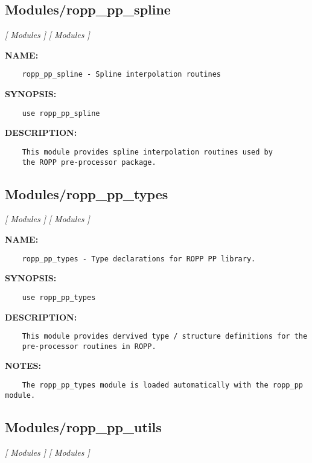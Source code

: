 \subsection{Modules/ropp\_pp\_spline}
\textsl{[ Modules ]}
\textsl{[ Modules ]}

\label{ch:robo47}
\label{ch:Modules_ropp_pp_spline}
\textbf{NAME:}\hspace{0.08in}\begin{Verbatim}
    ropp_pp_spline - Spline interpolation routines
\end{Verbatim}
\textbf{SYNOPSIS:}\hspace{0.08in}\begin{Verbatim}
    use ropp_pp_spline
\end{Verbatim}
\textbf{DESCRIPTION:}\hspace{0.08in}\begin{Verbatim}
    This module provides spline interpolation routines used by
    the ROPP pre-processor package.
\end{Verbatim}
\subsection{Modules/ropp\_pp\_types}
\textsl{[ Modules ]}
\textsl{[ Modules ]}

\label{ch:robo48}
\label{ch:Modules_ropp_pp_types}
\textbf{NAME:}\hspace{0.08in}\begin{Verbatim}
    ropp_pp_types - Type declarations for ROPP PP library.
\end{Verbatim}
\textbf{SYNOPSIS:}\hspace{0.08in}\begin{Verbatim}
    use ropp_pp_types
\end{Verbatim}
\textbf{DESCRIPTION:}\hspace{0.08in}\begin{Verbatim}
    This module provides dervived type / structure definitions for the
    pre-processor routines in ROPP.
\end{Verbatim}
\textbf{NOTES:}\hspace{0.08in}\begin{Verbatim}
    The ropp_pp_types module is loaded automatically with the ropp_pp module.
\end{Verbatim}
\subsection{Modules/ropp\_pp\_utils}
\textsl{[ Modules ]}
\textsl{[ Modules ]}

